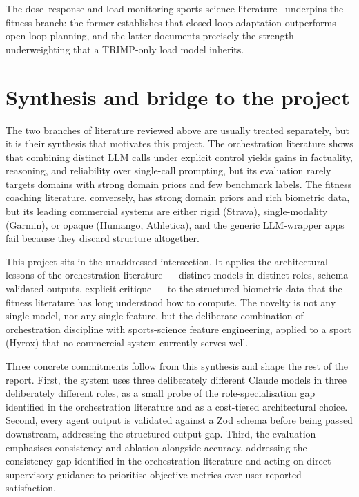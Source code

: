The dose--response and load-monitoring sports-science literature~\cite{busso2003,strength_load_critique} underpins the fitness branch: the former establishes that closed-loop adaptation outperforms open-loop planning, and the latter documents precisely the strength-underweighting that a TRIMP-only load model inherits.

\section{Synthesis and bridge to the project}

The two branches of literature reviewed above are usually treated separately, but it is their synthesis that motivates this project. The orchestration literature shows that combining distinct LLM calls under explicit control yields gains in factuality, reasoning, and reliability over single-call prompting, but its evaluation rarely targets domains with strong domain priors and few benchmark labels. The fitness coaching literature, conversely, has strong domain priors and rich biometric data, but its leading commercial systems are either rigid (Strava), single-modality (Garmin), or opaque (Humango, Athletica), and the generic LLM-wrapper apps fail because they discard structure altogether.

This project sits in the unaddressed intersection. It applies the architectural lessons of the orchestration literature --- distinct models in distinct roles, schema-validated outputs, explicit critique --- to the structured biometric data that the fitness literature has long understood how to compute. The novelty is not any single model, nor any single feature, but the deliberate combination of orchestration discipline with sports-science feature engineering, applied to a sport (Hyrox) that no commercial system currently serves well.

Three concrete commitments follow from this synthesis and shape the rest of the report. First, the system uses three deliberately different Claude models in three deliberately different roles, as a small probe of the role-specialisation gap identified in the orchestration literature and as a cost-tiered architectural choice. Second, every agent output is validated against a Zod schema before being passed downstream, addressing the structured-output gap. Third, the evaluation emphasises consistency and ablation alongside accuracy, addressing the consistency gap identified in the orchestration literature and acting on direct supervisory guidance to prioritise objective metrics over user-reported satisfaction.
